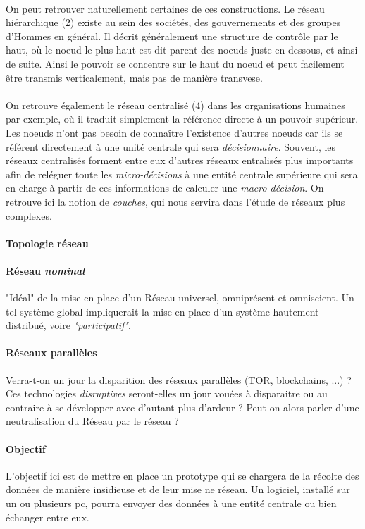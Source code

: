 \paragraph{} On peut retrouver naturellement certaines de ces constructions. Le réseau hiérarchique (2) existe
au sein des sociétés, des gouvernements et des groupes d'Hommes en général. Il décrit généralement une structure
de contrôle par le haut, où le noeud le plus haut est dit parent des noeuds juste en dessous, et ainsi de suite.
Ainsi le pouvoir se concentre sur le haut du noeud et peut facilement être transmis verticalement, mais pas de 
manière transvese.

\paragraph{} On retrouve également le réseau centralisé (4) dans les organisations humaines par exemple,
où il traduit simplement la référence directe à un pouvoir supérieur. Les noeuds n'ont pas besoin de connaître
l'existence d'autres noeuds car ils se référent directement à une unité centrale qui sera \emph{décisionnaire}.
Souvent, les réseaux centralisés forment entre eux d'autres réseaux entralisés plus importants afin de reléguer
toute les \emph{micro-décisions} à une entité centrale supérieure qui sera en charge à partir de ces informations
de calculer une \emph{macro-décision}. On retrouve ici la notion de \emph{couches}, qui nous servira dans l'étude
de réseaux plus complexes.

\paragraph{Topologie réseau}

\paragraph{Réseau \emph{nominal}} "Idéal" de la mise en place d'un Réseau universel, omniprésent
et omniscient. Un tel système global impliquerait la mise en place d'un système hautement
distribué, voire \emph{"participatif"}.

\paragraph{Réseaux parallèles} Verra-t-on un jour la disparition des réseaux parallèles
(TOR, blockchains, ...) ? Ces technologies \emph{disruptives} seront-elles un jour vouées
à disparaitre ou au contraire à se développer avec d'autant plus d'ardeur ? Peut-on alors
parler d'une neutralisation du Réseau par le réseau ?

\paragraph{Objectif} L'objectif ici est de mettre en place un prototype qui se chargera de la récolte des données
de manière insidieuse et de leur mise ne réseau. Un logiciel, installé sur un ou plusieurs pc,
pourra envoyer des données à une entité centrale ou bien échanger entre eux.
